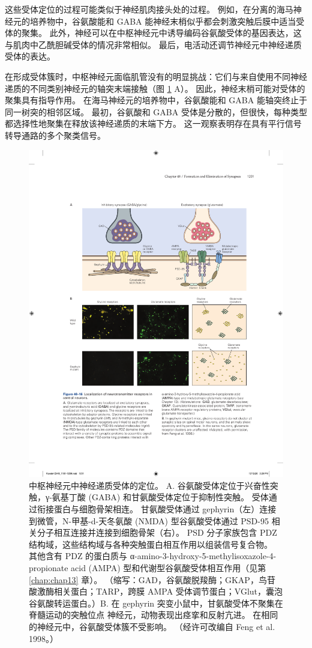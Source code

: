 这些受体定位的过程可能类似于神经肌肉接头处的过程。 例如，在分离的海马神经元的培养物中，谷氨酸能和 GABA 能神经末梢似乎都会刺激突触后膜中适当受体的聚集。 此外，神经可以在中枢神经元中诱导编码谷氨酸受体的基因表达，这与肌肉中乙酰胆碱受体的情况非常相似。 最后，电活动还调节神经元中神经递质受体的表达。

在形成受体簇时，中枢神经元面临肌管没有的明显挑战：它们与来自使用不同神经递质的不同类别神经元的轴突末端接触（图 \ref{fig:48_16} A）。 
因此，神经末梢可能对受体的聚集具有指导作用。 在海马神经元的培养物中，谷氨酸能和 GABA 能轴突终止于同一树突的相邻区域。 最初，谷氨酸和 GABA 受体是分散的，但很快，每种类型都选择性地聚集在释放该神经递质的末端下方。 这一观察表明存在具有平行信号转导通路的多个聚类信号。

\begin{figure}[htbp]
	\centering
	\includegraphics[width=0.8\linewidth]{chap48/fig_48_16}
	\caption{中枢神经元中神经递质受体的定位。 A. 谷氨酸受体定位于兴奋性突触，γ-氨基丁酸 (GABA) 和甘氨酸受体定位于抑制性突触。 受体通过衔接蛋白与细胞骨架相连。 甘氨酸受体通过 gephyrin（左）连接到微管，N-甲基-d-天冬氨酸 (NMDA) 型谷氨酸受体通过 PSD-95 相关分子相互连接并连接到细胞骨架（右）。 PSD 分子家族包含 PDZ 结构域，这些结构域与各种突触蛋白相互作用以组装信号复合物。 其他含有 PDZ 的蛋白质与 α-amino-3-hydroxy-5-methylisoxazole-4-propionate acid (AMPA) 型和代谢型谷氨酸受体相互作用（见第 \ref{chap:chap13} 章）。 （缩写：GAD，谷氨酸脱羧酶；GKAP，鸟苷酸激酶相关蛋白；TARP，跨膜 AMPA 受体调节蛋白；VGlut，囊泡谷氨酸转运蛋白。）B. 在 gephyrin 突变小鼠中，甘氨酸受体不聚集在脊髓运动的突触位点 神经元，动物表现出痉挛和反射亢进。 在相同的神经元中，谷氨酸受体簇不受影响。 （经许可改编自 Feng et al. 1998。）}
	\label{fig:48_16}
\end{figure}

